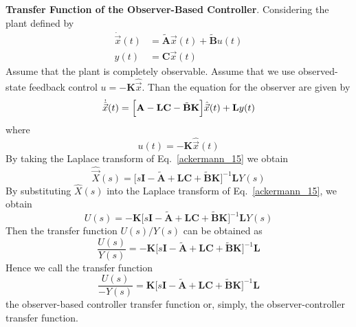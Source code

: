 \documentclass[11pt,a4paper,oneside]{book}
\numberwithin{equation}{section}
\theoremstyle{it}
\theoremstyle{definition}
\begin{document}
\vspace{5mm}
\textbf{Transfer Function of the Observer-Based Controller}. Considering the 
plant defined by
\begin{equation}
	\begin{split}
		\dot{\vec x}(t) & = \tilde{\mathbf{A}}\vec{x}(t)+ 
		\tilde{\mathbf{B}}u(t) \\
		y(t) & = \mathbf{C}\vec x(t)
	\end{split}
\end{equation} 
Assume that the plant is completely observable. Assume that we use 
observed-state feedback control $u=-\mathbf{K}\hat{\vec{x}}$. Than the equation 
for the observer are given by
\begin{equation} \label{ackermann_14}
	\dot{\hat{\vec x}}(t) = \Big[\mathbf{A} - \mathbf{LC} - 
	\tilde{\mathbf{B}}\mathbf{K}\Big]\hat{\vec x}(t) + 
	\mathbf{L}y(t) \\
\end{equation}
where
\begin{equation} \label{ackermann_15}
	u(t) = -\mathbf{K}\hat{\vec x}(t)
\end{equation}
By taking the Laplace transform of Eq.~\eqref{ackermann_15} we obtain 
\begin{equation}
	\hat{\vec{X}}(s) = \Big[s\mathbf{I} - \tilde{\mathbf{A}} + \mathbf{LC} + 
	\tilde{\mathbf{B}}\mathbf{K}\Big]^{-1}\mathbf{L}Y(s)
\end{equation} 
By substituting $\hat{X}(s)$ into the Laplace transform of 
Eq.~\eqref{ackermann_15}, we obtain
\begin{equation}\label{ackermann_16}
	U(s) = -\mathbf{K}\Big[s\mathbf{I} - \tilde{\mathbf{A}} + \mathbf{LC} + 
	\tilde{\mathbf{B}}\mathbf{K}\Big]^{-1}\mathbf{L}Y(s)
\end{equation} 
Then the transfer function $U(s)/Y(s)$ can be obtained as 
\begin{equation}
	\frac{U(s)}{Y(s)} = -\mathbf{K}\Big[s\mathbf{I} - \tilde{\mathbf{A}} + 
	\mathbf{LC} + \tilde{\mathbf{B}}\mathbf{K}\Big]^{-1}\mathbf{L}
\end{equation} 
Hence we call the transfer function 
\begin{equation}\label{ackermann_17}
	\frac{U(s)}{-Y(s)} = \mathbf{K}\Big[s\mathbf{I} - \tilde{\mathbf{A}} + 
	\mathbf{LC} + \tilde{\mathbf{B}}\mathbf{K}\Big]^{-1}\mathbf{L}
\end{equation} 
the observer-based controller transfer function or, simply, the 
observer-controller transfer function. 
\end{document}
